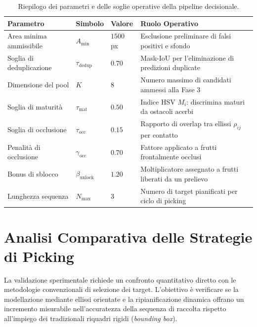 \begin{table}[htbp]
    \centering
    \small
    \setlength{\tabcolsep}{5pt}
    \caption{Riepilogo dei parametri e delle soglie operative della pipeline decisionale.}
    \label{tab:iperparametri_pipeline}
    \begin{tabular}{lll p{6.0cm}}
        \toprule
        \textbf{Parametro} & \textbf{Simbolo} & \textbf{Valore} & \textbf{Ruolo Operativo} \\
        \midrule
        Area minima ammissibile & $A_{\min}$ & $1500$ px & Esclusione preliminare di falsi positivi e sfondo \\
        Soglia di deduplicazione & $\tau_{\text{dedup}}$ & $0.70$ & Mask-IoU per l'eliminazione di predizioni duplicate \\
        Dimensione del pool & $K$ & $8$ & Numero massimo di candidati ammessi alla Fase 3 \\
        Soglia di maturità & $\tau_{\text{mat}}$ & $0.50$ & Indice HSV $M_i$: discrimina maturi da ostacoli acerbi \\
        Soglia di occlusione & $\tau_{\text{occ}}$ & $0.15$ & Rapporto di overlap tra ellissi $\rho_{ij}$ per contatto \\
        Penalità di occlusione & $\gamma_{\text{occ}}$ & $0.70$ & Fattore applicato a frutti frontalmente occlusi \\
        Bonus di sblocco & $\beta_{\text{unlock}}$ & $1.20$ & Moltiplicatore assegnato a frutti liberati da un prelievo \\
        Lunghezza sequenza & $N_{\max}$ & $3$ & Numero di target pianificati per ciclo di picking \\
        \bottomrule
    \end{tabular}
\end{table}

\section{Analisi Comparativa delle Strategie di Picking}
\label{sec:analisi_comparativa}

La validazione sperimentale richiede un confronto quantitativo diretto con le 
metodologie convenzionali di selezione dei target. L'obiettivo è verificare 
se la modellazione mediante ellissi orientate e la ripianificazione dinamica 
offrano un incremento misurabile nell'accuratezza della sequenza di raccolta 
rispetto all'impiego dei tradizionali riquadri rigidi (\textit{bounding box}).

